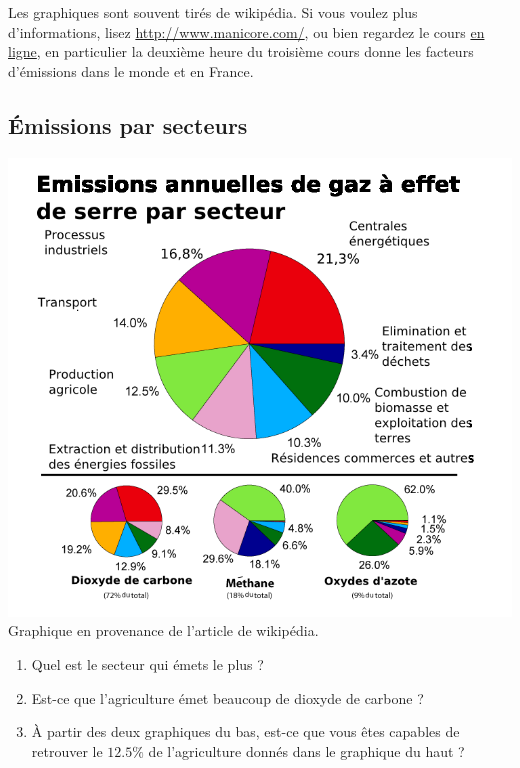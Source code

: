Les graphiques sont souvent tirés de wikipédia. Si vous voulez plus d'informations, lisez \url{http://www.manicore.com/}, ou bien regardez le cours \href{http://www.mines-paristech.fr/ingenieurcivil/SitesIC/Balado/Climat_som.html}{en ligne}, en particulier la deuxième heure du troisième cours donne les facteurs d'émissions dans le monde et en France.

\subsection{Émissions par secteurs}

\includegraphics[width=17cm]{Emission_de_GES.png}
Graphique en provenance de l'article  de wikipédia.

\begin{enumerate}
    \item
        Quel est le secteur qui émets le plus ?
    \item
        Est-ce que l'agriculture émet beaucoup de dioxyde de carbone ?
    \item
        À partir des deux graphiques du bas, est-ce que vous êtes capables de retrouver le \( 12.5\%\) de l'agriculture donnés dans le graphique du haut ?
\end{enumerate}

